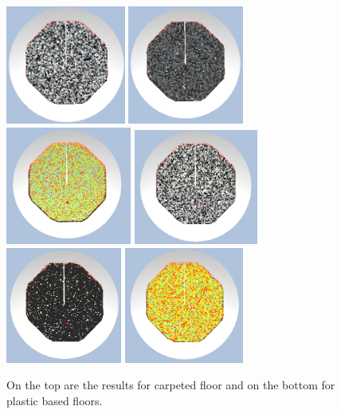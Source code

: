 \documentclass{thesis}
\begin{document}
\begin{figure}[H]
        \centering
        \includegraphics[width=1.55in]{images/freq_carpet}
        \includegraphics[width=1.5in]{images/intensity_carpet}
        \includegraphics[width=1.63in]{images/hybridVis_carpet}
        \includegraphics[width=1.6in]{images/freq_pvc}
        \includegraphics[width=1.5in]{images/intensity_pvc}
        \includegraphics[width=1.55in]{images/hybridVis_pvc}
        \caption{On the top are the results for carpeted floor and on the bottom for plastic based floors.}
    \end{figure}
    
\end{document}
